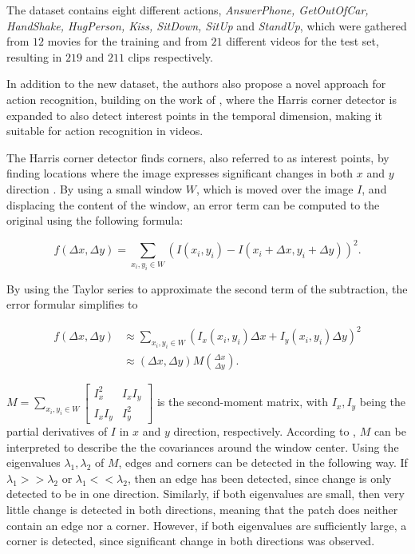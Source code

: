The dataset contains eight different actions, \textit{AnswerPhone, GetOutOfCar, HandShake, HugPerson, Kiss, SitDown, SitUp} and \textit{StandUp}, which were gathered from $12$ movies for the training and from $21$ different videos for the test set, resulting in $219$ and $211$ clips respectively.

In addition to the new dataset, the authors also propose a novel approach for action recognition, building on the work of \cite{laptev_harris3d}, where the Harris corner detector is expanded to also detect interest points in the temporal dimension, making it suitable for action recognition in videos.

The Harris corner detector \cite{harris_combined_1988} finds corners, also referred to as interest points, by finding locations where the image expresses significant changes in both $x$ and $y$ direction \cite{laptev_harris3d}.
By using a small window $W$, which is moved over the image $I$, and displacing the content of the window, an error term can be computed to the original using the following formula:

\begin{equation}
    f(\Delta x, \Delta y) = \sum_{x_i, y_i \in W} (I(x_i,y_i) - I(x_i + \Delta x, y_i + \Delta y))^2.
\end{equation}

By using the Taylor series to approximate the second term of the subtraction, the error formular simplifies to

\begin{equation}
    \begin{split}
        f(\Delta x, \Delta y) 
        &\approx \sum_{x_i, y_i \in W} (I_x(x_i, y_i) \Delta x + I_y(x_i, y_i) \Delta y)^2 \\
        &\approx (\Delta x, \Delta y) M \binom{\Delta x}{\Delta y}.
    \end{split}
\end{equation}

$
M = \sum_{x_i, y_i \in W} 
\begin{bmatrix}
    I_x^2 & I_x I_y \\
    I_x I_y & I_y^2
\end{bmatrix}
$ is the second-moment matrix, with $I_x, I_y$ being the partial derivatives of $I$ in $x$ and $y$ direction, respectively.
According to \cite{laptev_harris3d}, $M$ can be interpreted to describe the the covariances around the window center.
Using the eigenvalues $\lambda_1, \lambda_2$ of $M$, edges and corners can be detected in the following way.
If $\lambda_1 >>\lambda_2$ or $\lambda_1 << \lambda_2$, then an edge has been detected, since change is only detected to be in one direction.
Similarly, if both eigenvalues are small, then very little change is detected in both directions, meaning that the patch does neither contain an edge nor a corner.
However, if both eigenvalues are sufficiently large, a corner is detected, since significant change in both directions was observed.

